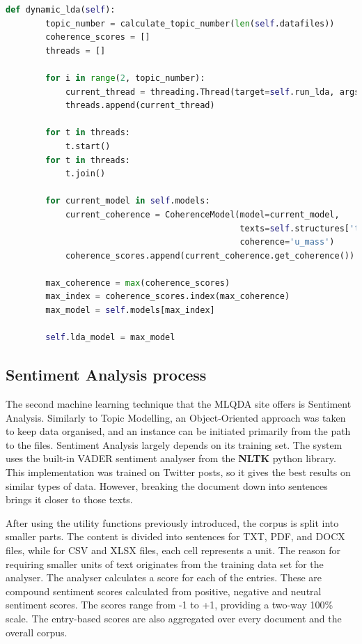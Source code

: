 \documentclass{l4proj}
\begin{document}
\begin{lstlisting}[language=python,
caption={Function to concurrently run multiple LDA Topic Modelling.},
label=lst:mlqda_dynamic_lda]
    def dynamic_lda(self):
        topic_number = calculate_topic_number(len(self.datafiles))
        coherence_scores = []
        threads = []

        for i in range(2, topic_number):
            current_thread = threading.Thread(target=self.run_lda, args=(i, ))
            threads.append(current_thread)

        for t in threads:
            t.start()
        for t in threads:
            t.join()

        for current_model in self.models:
            current_coherence = CoherenceModel(model=current_model,
                                               texts=self.structures['trigram_texts'],
                                               coherence='u_mass')
            coherence_scores.append(current_coherence.get_coherence())

        max_coherence = max(coherence_scores)
        max_index = coherence_scores.index(max_coherence)
        max_model = self.models[max_index]

        self.lda_model = max_model
\end{lstlisting}






\subsection{Sentiment Analysis process}
The second machine learning technique that the MLQDA site offers is Sentiment Analysis. Similarly to Topic Modelling, an Object-Oriented approach was taken to keep data organised, and an instance can be initiated primarily from the path to the files. Sentiment Analysis largely depends on its training set. The system uses the built-in VADER sentiment analyser from the \textbf{NLTK} python library. This implementation was trained on Twitter posts, so it gives the best results on similar types of data. However, breaking the document down into sentences brings it closer to those texts.

After using the utility functions previously introduced, the corpus is split into smaller parts. The content is divided into sentences for TXT, PDF, and DOCX files, while for CSV and XLSX files, each cell represents a unit. The reason for requiring smaller units of text originates from the training data set for the analyser. The analyser calculates a score for each of the entries. These are compound sentiment scores calculated from positive, negative and neutral sentiment scores. The scores range from -1 to +1, providing a two-way 100\% scale. The entry-based scores are also aggregated over every document and the overall corpus.
\end{document}
